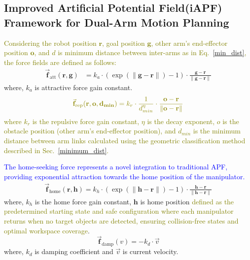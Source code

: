 \documentclass[utf8]{FrontiersinHarvard}
\begin{document}
\subsection{Improved Artificial Potential Field(iAPF) Framework for Dual-Arm Motion Planning}
\textcolor{olive}{\noindent Considering the robot position \( \mathbf{r}\), goal position \( \mathbf{g} \), other arm's end-effector position \( \mathbf{o}\), and $d$ is minimum distance between inter-arms as in Eq.~\ref{min_dist},  the force fields are defined as follows:}
\begin{equation}
\begin{aligned}
\vec{\mathbf{f}}_{\text{att}}(\mathbf{r}, \mathbf{g}) &= 
k_a \cdot \left( \exp(\|\mathbf{g} - \mathbf{r}\|) - 1 \right) \cdot \frac{\mathbf{g} - \mathbf{r}}{\|\mathbf{g} - \mathbf{r}\|}
\end{aligned}
\label{eq:attractive_force}
\end{equation}
where,
\( k_a \) is attractive force gain constant.
\begin{equation}
\textcolor{olive}{
\begin{aligned}
\vec{\mathbf{f}}_{\text{rep}}(\mathbf{r}, \mathbf{o}, \mathbf{d_{min}}) = 
k_r \cdot \frac{1}{d_{min}^\eta} \cdot \frac{\mathbf{o} - \mathbf{r}}{\|\mathbf{o} - \mathbf{r}\|}
\end{aligned}}
\label{eq:repulsive_force}
\end{equation}
\textcolor{olive}{\noindent where $k_r$ is the repulsive force gain constant, $\eta$ is the decay exponent, $o$ is the obstacle position (other arm's end-effector position), and $d_{min}$ is the minimum distance between arm links calculated using the geometric classification method described in Sec.~\ref{minimum_dist}.}

\textcolor{blue}{ The home-seeking force represents a novel integration to traditional APF, providing exponential attraction towards the home position of the manipulator.}
\begin{equation}
    \begin{aligned}
    \vec{\mathbf{f}}_{\text{home}}(\mathbf{r}, \mathbf{h}) = k_h \cdot \left( \exp(\|\mathbf{h} - \mathbf{r}\|) - 1 \right) \cdot \frac{\mathbf{h} - \mathbf{r}}{\|\mathbf{h} - \mathbf{r}\|}
    \end{aligned}
    \label{homeforce}
\end{equation}
where, \( k_h \) is the home force gain constant, \( \mathbf{h} \) is home position \textcolor{olive}{defined as the predetermined starting state and safe configuration where each manipulator returns when no target objects are detected, ensuring collision-free states and optimal workspace coverage}.
\begin{equation}
    \vec{\mathbf{f}}_{\text{damp}}({v}) = -k_d \cdot {\vec{v}} 
    \label{dampforce}
\end{equation}
where, \( k_d \) is damping coefficient and \( \vec{{v}} \) is current velocity.
\end{document}
